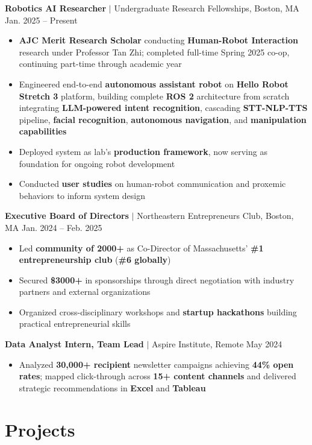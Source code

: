 \documentclass[11pt,letterpaper]{article}
\begin{document}
\textbf{Robotics AI Researcher} $|$ Undergraduate Research Fellowships, Boston, MA \hfill Jan. 2025 -- Present
\begin{itemize}
    \item \textbf{AJC Merit Research Scholar} conducting \textbf{Human-Robot Interaction} research under Professor Tan Zhi; completed full-time Spring 2025 co-op, continuing part-time through academic year
    \item Engineered end-to-end \textbf{autonomous assistant robot} on \textbf{Hello Robot Stretch 3} platform, building complete \textbf{ROS 2} architecture from scratch integrating \textbf{LLM-powered intent recognition}, cascading \textbf{STT-NLP-TTS} pipeline, \textbf{facial recognition}, \textbf{autonomous navigation}, and \textbf{manipulation capabilities}
    \item Deployed system as lab's \textbf{production framework}, now serving as foundation for ongoing robot development
    \item Conducted \textbf{user studies} on human-robot communication and proxemic behaviors to inform system design
\end{itemize}

\textbf{Executive Board of Directors} $|$ Northeastern Entrepreneurs Club, Boston, MA \hfill Jan. 2024 -- Feb. 2025
\begin{itemize}
    \item Led \textbf{community of 2000+} as Co-Director of Massachusetts' \textbf{\#1 entrepreneurship club} (\textbf{\#6 globally})
    \item Secured \textbf{\$3000+} in sponsorships through direct negotiation with industry partners and external organizations
    \item Organized cross-disciplinary workshops and \textbf{startup hackathons} building practical entrepreneurial skills
\end{itemize}

\textbf{Data Analyst Intern, Team Lead} $|$ Aspire Institute, Remote \hfill May 2024
\begin{itemize}
    \item Analyzed \textbf{30,000+ recipient} newsletter campaigns achieving \textbf{44\% open rates}; mapped click-through across \textbf{15+ content channels} and delivered strategic recommendations in \textbf{Excel} and \textbf{Tableau}
\end{itemize}

\section{Projects}
\end{document}
